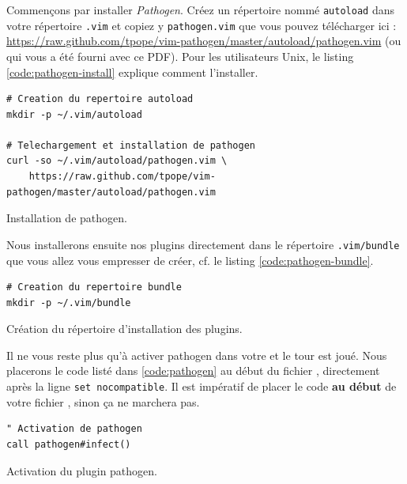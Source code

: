 Commençons par installer \emph{Pathogen}. Créez un répertoire nommé \Verb|autoload| dans votre répertoire \Verb|.vim| et copiez y \Verb|pathogen.vim| que vous pouvez télécharger ici : \url{https://raw.github.com/tpope/vim-pathogen/master/autoload/pathogen.vim} (ou qui vous a été fourni avec ce PDF). Pour les utilisateurs Unix, le listing \ref{code:pathogen-install} explique comment l'installer.

\begin{listing}[H]
\begin{verbatim}
# Creation du repertoire autoload
mkdir -p ~/.vim/autoload 

# Telechargement et installation de pathogen
curl -so ~/.vim/autoload/pathogen.vim \
    https://raw.github.com/tpope/vim-pathogen/master/autoload/pathogen.vim
\end{verbatim}
  \caption{Installation de pathogen.}
  \label{code:pathogen-install}
\end{listing}

Nous installerons ensuite nos plugins directement dans le répertoire \Verb|.vim/bundle| que vous allez vous empresser de créer, cf. le listing \ref{code:pathogen-bundle}.

\begin{listing}[H]
\begin{verbatim}
# Creation du repertoire bundle
mkdir -p ~/.vim/bundle
\end{verbatim}
  \caption{Création du répertoire d'installation des plugins.}
  \label{code:pathogen-bundle}
\end{listing}

Il ne vous reste plus qu'à activer pathogen dans votre \vimrc et le tour est joué. Nous placerons le code listé dans 
\ref{code:pathogen} au début du fichier \vimrc, directement après la ligne \Verb|set nocompatible|. Il est impératif de placer le code \textbf{au début} de votre fichier \vimrc, sinon ça ne marchera pas.

\begin{listing}[H]

\begin{verbatim}
" Activation de pathogen
call pathogen#infect()
\end{verbatim}
\caption{Activation du plugin pathogen.}
\label{code:pathogen}
\end{listing}

